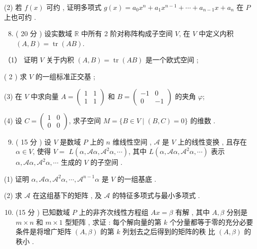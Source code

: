 \documentclass[10pt]{article}
\begin{document}
{(2)  若  $f(x)$  可约 ,  证明多项式  $g(x)=a_{0} x^{n}+a_{1} x^{n-1}+\cdots+a_{n-1} x+a_{n}$  在  $P$  上也可约 .

\begin{enumerate}
  \setcounter{enumi}{7}
  \item ( 20  分 )  设实数域  $\mathbb{R}$  中所有  2  阶对称阵构成子空间  $V$,  在  $V$  中定义内积  $(A, B)=\operatorname{tr}(A B)$.
\end{enumerate}
（1） 证明  $V$  关于内积  $(A, B)=\operatorname{tr}(A B)$  是一个欧式空间 ;

( 2 )  求  $V$  的一组标准正交基 ;

(3)  在  $V$  中求向量  $A=\left(\begin{array}{cc}1 & 1 \\ 1 & 1\end{array}\right)$  和  $B=\left(\begin{array}{cc}-1 & 0 \\ 0 & -1\end{array}\right)$  的夹角  $\varphi$;

(4)  设  $C=\left(\begin{array}{ll}1 & 0 \\ 0 & 0\end{array}\right)$,  求子空间  $M=\{B \in V \mid(B, C)=0\}$  的维数 .

\begin{enumerate}
  \setcounter{enumi}{8}
  \item ( 15  分 )  设  $V$  是数域  $P$  上的  $n$  维线性空间 , $\mathscr{A}$  是  $V$  上的线性变换 ,  且存在  $\alpha \in V$,  使得  $V=$ $L\left(\alpha, \mathscr{A} \alpha, \mathscr{A}^{2} \alpha, \cdots\right)$,  其中  $L\left(\alpha, \mathscr{A} \alpha, \mathscr{A}^{2} \alpha, \cdots\right)$  表示  $\alpha, \mathscr{A} \alpha, \mathscr{A}^{2} \alpha, \cdots$  生成的  $V$  的子空间 .
\end{enumerate}
(1)  证明  $\alpha, \mathscr{A} \alpha, \mathscr{A}^{2} \alpha, \cdots, \mathscr{A}^{n-1} \alpha$  是  $V$  的一组基底 .

(2)  求  $\mathscr{A}$  在这组基下的矩阵 ,  及  $\mathscr{A}$  的特征多项式与最小多项式 .

\begin{enumerate}
  \setcounter{enumi}{9}
  \item (15  分 )  已知数域  $P$  上的非齐次线性方程组  $A x=\beta$  有解 ,  其中  $A, \beta$  分别是  $m \times n$  和  $m \times 1$  型矩阵 ,  求证 :  每个解向量的第  $k$  个分量都等于零的充分必要条件是将增广矩阵  $(A, \beta)$  的第  $k$  列划去之后得到的矩阵的秩   比  $(A, \beta)$  的秩小 .
\end{enumerate}
}
\end{document}
